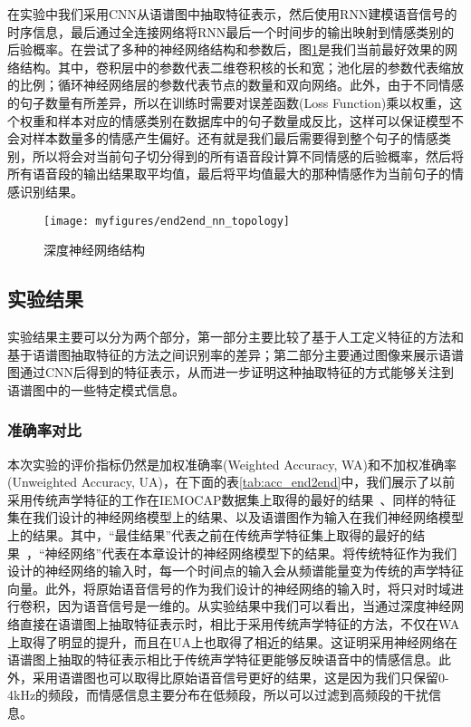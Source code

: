 在实验中我们采用CNN从语谱图中抽取特征表示，然后使用RNN建模语音信号的时序信息，最后通过全连接网络将RNN最后一个时间步的输出映射到情感类别的后验概率。在尝试了多种的神经网络结构和参数后，图\ref{fig:end2end_nn_topology}是我们当前最好效果的网络结构。其中，卷积层中的参数代表二维卷积核的长和宽；池化层的参数代表缩放的比例；循环神经网络层的参数代表节点的数量和双向网络。此外，由于不同情感的句子数量有所差异，所以在训练时需要对误差函数(Loss Function)乘以权重，这个权重和样本对应的情感类别在数据库中的句子数量成反比，这样可以保证模型不会对样本数量多的情感产生偏好。还有就是我们最后需要得到整个句子的情感类别，所以将会对当前句子切分得到的所有语音段计算不同情感的后验概率，然后将所有语音段的输出结果取平均值，最后将平均值最大的那种情感作为当前句子的情感识别结果。

\begin{figure}[htb] %
    \vspace{-0.8cm}  %
    \setlength{\belowcaptionskip}{0cm}   %
    \centering
    \texttt{[image: myfigures/end2end\_nn\_topology]}
    \caption{深度神经网络结构}
    \label{fig:end2end_nn_topology}
\end{figure}

\subsection{实验结果}
\label{ssec:end2end_experiment_result}

实验结果主要可以分为两个部分，第一部分主要比较了基于人工定义特征的方法和基于语谱图抽取特征的方法之间识别率的差异；第二部分主要通过图像来展示语谱图通过CNN后得到的特征表示，从而进一步证明这种抽取特征的方式能够关注到语谱图中的一些特定模式信息。

\subsubsection{准确率对比}
\label{sssec:end2end_acc_comp}

本次实验的评价指标仍然是加权准确率(Weighted Accuracy, WA)和不加权准确率(Unweighted Accuracy, UA)，在下面的表\ref{tab:acc_end2end}中，我们展示了以前采用传统声学特征的工作在IEMOCAP数据集上取得的最好的结果~\cite{Lee2015High}、同样的特征集在我们设计的神经网络模型上的结果、以及语谱图作为输入在我们神经网络模型上的结果。其中，“最佳结果”代表之前在传统声学特征集上取得的最好的结果~\cite{Lee2015High}，“神经网络”代表在本章设计的神经网络模型下的结果。将传统特征作为我们设计的神经网络的输入时，每一个时间点的输入会从频谱能量变为传统的声学特征向量。此外，将原始语音信号的作为我们设计的神经网络的输入时，将只对时域进行卷积，因为语音信号是一维的。从实验结果中我们可以看出，当通过深度神经网络直接在语谱图上抽取特征表示时，相比于采用传统声学特征的方法，不仅在WA上取得了明显的提升，而且在UA上也取得了相近的结果。这证明采用神经网络在语谱图上抽取的特征表示相比于传统声学特征更能够反映语音中的情感信息。此外，采用语谱图也可以取得比原始语音信号更好的结果，这是因为我们只保留0-4kHz的频段，而情感信息主要分布在低频段，所以可以过滤到高频段的干扰信息。

